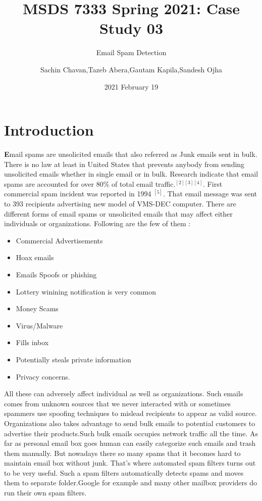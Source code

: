 \documentclass[
]{article}
\title{MSDS 7333 Spring 2021: Case Study 03}
\subtitle{Email Spam Detection}
\author{Sachin Chavan,Tazeb Abera,Gautam Kapila,Sandesh Ojha}
\date{2021 February 19}
\providecommand{\tightlist}{%
  \setlength{\itemsep}{0pt}\setlength{\parskip}{0pt}}
\begin{document}
\maketitle

\hypertarget{introduction}{%
\section{Introduction}\label{introduction}}

\textbf{E}mail spams are unsolicited emails that also referred as Junk
emails sent in bulk. There is no law at least in United States that
prevents anybody from sending unsolicited emails whether in single email
or in bulk. Research indicate that email spams are accounted for over
80\% of total email traffic.\(^{[2][3][4]}\). First commercial spam
incident was reported in 1994 \(^{[5]}\). That email message was sent to
393 recipients advertising new model of VMS-DEC computer. There are
different forms of email spams or unsolicited emails that may affect
either individuals or organizations. Following are the few of them :

\begin{itemize}
\tightlist
\item
  Commercial Advertisements
\item
  Hoax emails
\item
  Emails Spoofs or phishing
\item
  Lottery winining notification is very common
\item
  Money Scams
\item
  Virus/Malware
\item
  Fills inbox
\item
  Potentially steals private information
\item
  Privacy concerns.
\end{itemize}

All these can adversely affect individual as well as organizations. Such
emails comes from unknown sources that we never interacted with or
sometimes spammers use spoofing techniques to mislead recipients to
appear as valid source. Organizations also takes advantage to send bulk
emails to potential customers to advertise their products.Such bulk
emails occupies network traffic all the time. As far as personal email
box goes human can easily categorize such emails and trash them
manually. But nowadays there so many spams that it becomes hard to
maintain email box without junk. That's where automated spam filters
turns out to be very useful. Such a spam filters automatically detects
spams and moves them to separate folder.Google for example and many
other mailbox providers do run their own spam filters.
\end{document}

